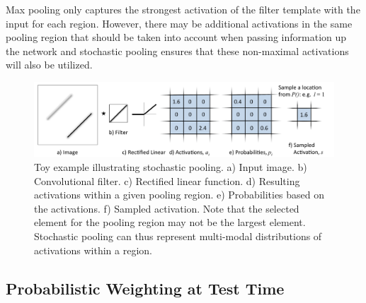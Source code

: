 \documentclass{article} %
\newcommand{\fig}[1]{Fig.~\ref{fig:#1}}
\begin{document}

Max pooling only captures the strongest activation of the filter
template with the input for each region. However, there may be
additional activations in the same pooling region that should be taken
into account when passing information up the network and stochastic
pooling ensures that these non-maximal activations will also be utilized.



\begin{figure}[h!]
\begin{center}
\includegraphics[width=5.5in]{toy.pdf}
\end{center}
\vspace*{-0.2cm}
\caption{Toy example illustrating stochastic pooling. a) Input image. b)
  Convolutional filter. c) Rectified linear function. d) Resulting activations within a given pooling region. e) Probabilities based
  on the activations. f) Sampled activation. Note that the selected
  element for the pooling region may not be the largest
  element. Stochastic pooling can thus represent multi-modal
  distributions of activations within a region.}
\label{fig:toy}
\vspace*{-0.2cm}
\end{figure}


\subsection{Probabilistic Weighting at Test Time}
\end{document}
